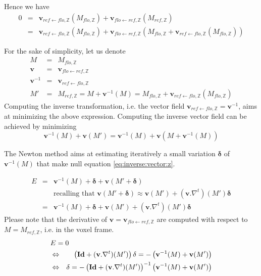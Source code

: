 Hence we have 
\begin{eqnarray*}
0 & = & 
\mathbf{v}_{ref \leftarrow flo, \mathbb{Z}}(M_{flo,\mathbb{Z}} )
+
\mathbf{v}_{flo \leftarrow ref, \mathbb{Z}}(M_{ref,\mathbb{Z}} )
\\
& = &
\mathbf{v}_{ref \leftarrow flo, \mathbb{Z}}(M_{flo,\mathbb{Z}} )
+
\mathbf{v}_{flo \leftarrow ref, \mathbb{Z}}(
M_{flo,\mathbb{Z}} 
+ \mathbf{v}_{ref \leftarrow flo, \mathbb{Z}}(M_{flo,\mathbb{Z}})
)
\end{eqnarray*}

For the sake of simplicity, let us denote 
\begin{eqnarray*}
M & = & M_{flo,\mathbb{Z}} \\
\mathbf{v} & = & \mathbf{v}_{flo \leftarrow ref, \mathbb{Z}} \\
\mathbf{v}^{-1} & = & \mathbf{v}_{ref \leftarrow flo, \mathbb{Z}} \\
M' & = & M_{ref,\mathbb{Z}} = 
M + \mathbf{v}^{-1}(M) =
M_{flo,\mathbb{Z}} + \mathbf{v}_{ref \leftarrow flo, \mathbb{Z}}(M_{flo,\mathbb{Z}})
\end{eqnarray*}
Computing the inverse transformation, i.e. the vector field $\mathbf{v}_{ref \leftarrow flo, \mathbb{Z}} = \mathbf{v}^{-1}$, aims at minimizing the above expression. 
Computing the inverse vector field can be achieved by minimizing
\begin{equation}
\mathbf{v}^{-1}(M) + \mathbf{v}( M' )
= \mathbf{v}^{-1}(M) + \mathbf{v}( M + \mathbf{v}^{-1}(M) )
\label{eq:inverse:vector:z}
\end{equation} 

The Newton method aims at estimating iteratively a small variation $\mathbf{\delta}$ of $\mathbf{v}^{-1}(M)$ that make null equation \ref{eq:inverse:vector:z}.

\begin{eqnarray*}
E & = &
\mathbf{v}^{-1}(M) + \mathbf{\delta} 
+ \mathbf{v}( M' + \mathbf{\delta} )
\\
& & \mbox{recalling that }
\mathbf{v}(M' + \mathbf{\delta}) \approx 
\mathbf{v}( M' ) + (\mathbf{v}.\nabla^t)(M') \mathbf{\delta}
\\
& = &
\mathbf{v}^{-1}(M) + \mathbf{\delta} +
\mathbf{v}( M' )
+ (\mathbf{v}.\nabla^t)( M' ) \mathbf{\delta} 
\end{eqnarray*}
Please note that the derivative of 
$\mathbf{v} = \mathbf{v}_{flo \leftarrow ref, \mathbb{Z}}$ are computed with respect to $M = M_{ref,\mathbb{Z}}$, i.e. in the voxel frame.
\begin{eqnarray*}
\lefteqn{ E = 0 } \\
& \Leftrightarrow &
\left(
\mathbf{Id} + (\mathbf{v}.\nabla^t)( M' )
\right) \mathbf{\delta} 
= - \left( \mathbf{v}^{-1}(M) + \mathbf{v}( M' )
\right) \\
& \Leftrightarrow &
\mathbf{\delta}  =
- \left(
\mathbf{Id} + (\mathbf{v}.\nabla^t)( M' )
\right)^{-1}
\left( \mathbf{v}^{-1}(M) + \mathbf{v}( M' )
\right)
\end{eqnarray*}

